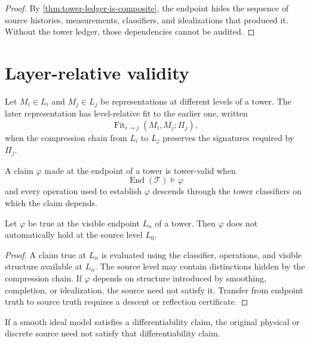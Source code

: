 \begin{proof}
By \autoref{thm:tower-ledger-is-composite}, the endpoint hides the sequence of source histories, measurements, classifiers, and idealizations that produced it. Without the tower ledger, those dependencies cannot be audited.
\end{proof}

\section{Layer-relative validity}
\label{sec:layer-relative-validity}

\begin{definition}
\label{def:level-relative-fit}
Let $M_i\in L_i$ and $M_j\in L_j$ be representations at different levels of a tower. The later representation has level-relative fit to the earlier one, written
$$
\operatorname{Fit}_{i\to j}(M_i,M_j;\Pi_j),
$$
when the compression chain from $L_i$ to $L_j$ preserves the signatures required by $\Pi_j$.
\end{definition}

\begin{definition}
\label{def:tower-valid-claim}
A claim $\varphi$ made at the endpoint of a tower is tower-valid when
$$
\operatorname{End}(\mathcal T)\models\varphi
$$
and every operation used to establish $\varphi$ descends through the tower classifiers on which the claim depends.
\end{definition}

\begin{theorem}
\label{thm:endpoint-truth-not-source-truth}
Let $\varphi$ be true at the visible endpoint $L_n$ of a tower. Then $\varphi$ does not automatically hold at the source level $L_0$.
\end{theorem}

\begin{proof}
A claim true at $L_n$ is evaluated using the classifier, operations, and visible structure available at $L_n$. The source level may contain distinctions hidden by the compression chain. If $\varphi$ depends on structure introduced by smoothing, completion, or idealization, the source need not satisfy it. Transfer from endpoint truth to source truth requires a descent or reflection certificate.
\end{proof}

\begin{corollary}
\label{cor:smooth-endpoint-not-rough-source}
If a smooth ideal model satisfies a differentiability claim, the original physical or discrete source need not satisfy that differentiability claim.
\end{corollary}

